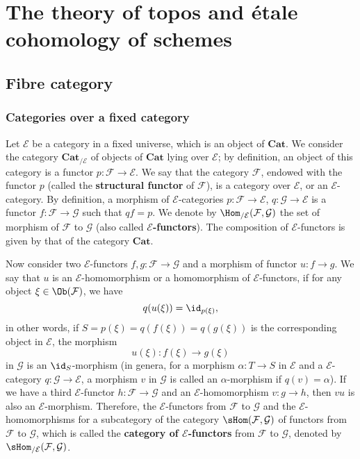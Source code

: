 \chapter{The theory of topos and \'etale cohomology of schemes}
\section{Fibre category}\label{fibre cat category section}
\subsection{Categories over a fixed category}\label{fibre cat E-category subsection}
Let $\mathcal{E}$ be a category in a fixed universe, which is an object of $\mathbf{Cat}$. We consider the category $\mathbf{Cat}_{/\mathcal{E}}$ of objects of $\mathbf{Cat}$ lying over $\mathcal{E}$; by definition, an object of this category is a functor $p:\mathcal{F}\to \mathcal{E}$. We say that the category $\mathcal{F}$, endowed with the functor $p$ (called the \textbf{structural functor} of $\mathcal{F}$), is a category over $\mathcal{E}$, or an $\mathcal{E}$-category. By definition, a morphism of $\mathcal{E}$-categories $p:\mathcal{F}\to \mathcal{E}$, $q:\mathcal{G}\to \mathcal{E}$ is a functor $f:\mathcal{F}\to \mathcal{G}$ such that $qf=p$. We denote by $\Hom_{/\mathcal{E}}(\mathcal{F},\mathcal{G})$ the set of morphism of $\mathcal{F}$ to $\mathcal{G}$ (also called \textbf{$\mathcal{E}$-functors}). The composition of $\mathcal{E}$-functors is given by that of the category $\mathbf{Cat}$.\par
Now consider two $\mathcal{E}$-functors $f,g:\mathcal{F}\to \mathcal{G}$ and a morphism of functor $u:f\to g$. We say that $u$ is an $\mathcal{E}$-homomorphism or a homomorphism of $\mathcal{E}$-functors, if for any object $\xi\in\Ob(\mathcal{F})$, we have
\[q(u(\xi))=\id_{p(\xi)},\]
in other words, if $S=p(\xi)=q(f(\xi))=q(g(\xi))$ is the corresponding object in $\mathcal{E}$, the morphism
\[u(\xi):f(\xi)\to g(\xi)\]
in $\mathcal{G}$ is an $\id_S$-morphism (in genera, for a morphism $\alpha:T\to S$ in $\mathcal{E}$ and a $\mathcal{E}$-category $q:\mathcal{G}\to \mathcal{E}$, a morphism $v$ in $\mathcal{G}$ is called an $\alpha$-morphism if $q(v)=\alpha$). If we have a third $\mathcal{E}$-functor $h:\mathcal{F}\to \mathcal{G}$ and an $\mathcal{E}$-homomorphism $v:g\to h$, then $vu$ is also an $\mathcal{E}$-morphism. Therefore, the $\mathcal{E}$-functors from $\mathcal{F}$ to $\mathcal{G}$ and the $\mathcal{E}$-homomorphisms  for a subcategory of the category $\sHom(\mathcal{F},\mathcal{G})$ of functors from $\mathcal{F}$ to $\mathcal{G}$, which is called the \textbf{category of $\mathcal{E}$-functors} from $\mathcal{F}$ to $\mathcal{G}$, denoted by $\sHom_{/\mathcal{E}}(\mathcal{F},\mathcal{G})$.\par
